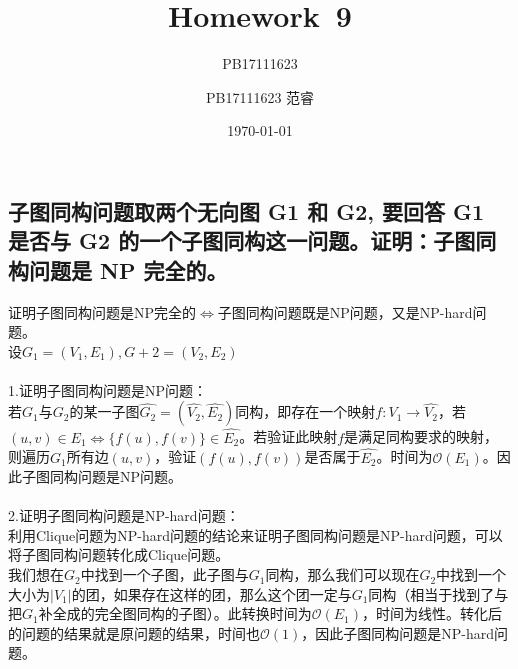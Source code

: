 \documentclass[UTF8]{ctexart}
\title{Homework\ 9}
\author{PB17111623}
\author{PB17111623 范睿}
\date{\today}
\begin{document}
\maketitle
\section{}
\subsection{子图同构问题取两个无向图 G1 和 G2, 要回答 G1 是否与 G2 的一个子图同构这一问题。证明：子图同构问题是 NP 完全的。}
证明子图同构问题是NP完全的$\Leftrightarrow$子图同构问题既是NP问题，又是NP-hard问题。\\
设$G_1=(V_1,E_1),G+2=(V_2,E_2)$\\\\
1.证明子图同构问题是NP问题：\\
若$G_1$与$G_2$的某一子图$\hat{G_2}=(\hat{V_2},\hat{E_2})$同构，即存在一个映射$f:V_1\rightarrow \hat{V_2}$，若$(u,v)\in E_1\Leftrightarrow \{f(u),f(v)\}\in \hat{E_2}$。若验证此映射$f$是满足同构要求的映射，则遍历$G_1$所有边$(u,v)$，验证$(f(u),f(v))$是否属于$\hat{E_2}$。时间为$\mathcal{O}(E_1)$。因此子图同构问题是NP问题。\\\\
2.证明子图同构问题是NP-hard问题：\\
利用Clique问题为NP-hard问题的结论来证明子图同构问题是NP-hard问题，可以将子图同构问题转化成Clique问题。\\
我们想在$G_2$中找到一个子图，此子图与$G_1$同构，那么我们可以现在$G_2$中找到一个大小为$|V_1|$的团，如果存在这样的团，那么这个团一定与$G_1$同构（相当于找到了与把$G_1$补全成的完全图同构的子图）。此转换时间为$\mathcal{O}(E_1)$，时间为线性。转化后的问题的结果就是原问题的结果，时间也$\mathcal{O}(1)$，因此子图同构问题是NP-hard问题。
\end{document}
